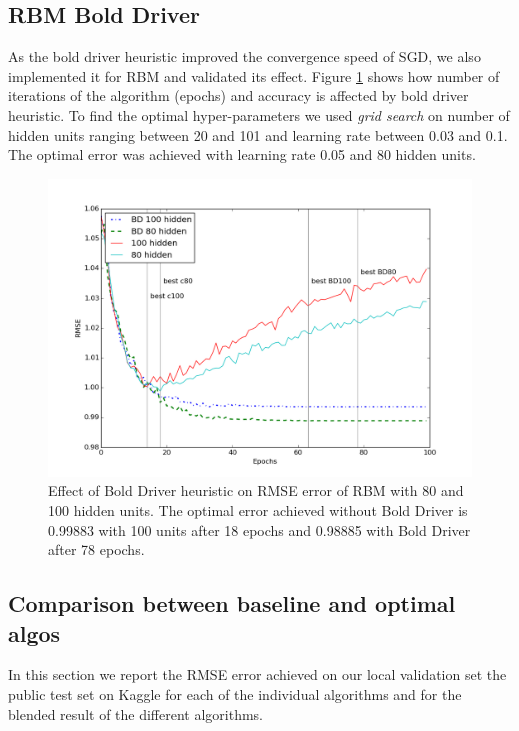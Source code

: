 \documentclass[10pt,conference,compsocconf]{IEEEtran}
\begin{document}
	\subsection{RBM Bold Driver}
	As the bold driver heuristic improved the convergence speed of SGD, we also implemented it for RBM and validated its effect. Figure \ref{fig:rbm-conv-zoom} shows how number of iterations of the algorithm (epochs) and accuracy is affected by bold driver heuristic. To find the optimal hyper-parameters we used \textit{grid search} on number of hidden units ranging between 20 and 101 and learning rate between 0.03 and 0.1. The optimal error was achieved with learning rate 0.05 and 80 hidden units.
	
	
	
	\begin{figure}[htbp]
		\centering
		\includegraphics[width=\columnwidth]{conv_rbm_all.png}
		\caption{Effect of Bold Driver heuristic on RMSE error of RBM with 80 and 100 hidden units. The optimal error achieved without Bold Driver is 0.99883 with 100 units after 18 epochs and 0.98885 with Bold Driver after 78 epochs.}
		\label{fig:rbm-conv-zoom}
	\end{figure} 
	
	\subsection{Comparison between baseline and optimal algos}
	In this section we report the RMSE error achieved on our local validation set the public test set on Kaggle for each of the individual algorithms and for the blended result of the different algorithms.
	
\end{document}
